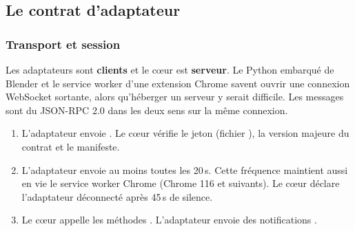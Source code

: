 \subsection{Le contrat d'adaptateur}

\subsubsection{Transport et session}

Les adaptateurs sont \textbf{clients} et le cœur est \textbf{serveur}. Le Python embarqué de Blender et le service worker d'une extension Chrome savent ouvrir une connexion WebSocket sortante, alors qu'héberger un serveur y serait difficile. Les messages sont du JSON-RPC 2.0 dans les deux sens sur la même connexion.

\begin{enumerate}[leftmargin=1.2em]
  \item L'adaptateur envoie . Le cœur vérifie le jeton (fichier ), la version majeure du contrat et le manifeste.
  \item L'adaptateur envoie  au moins toutes les 20\,s. Cette fréquence maintient aussi en vie le service worker Chrome (Chrome 116 et suivants). Le cœur déclare l'adaptateur déconnecté après 45\,s de silence.
  \item Le cœur appelle les méthodes . L'adaptateur envoie des notifications .
\end{enumerate}

